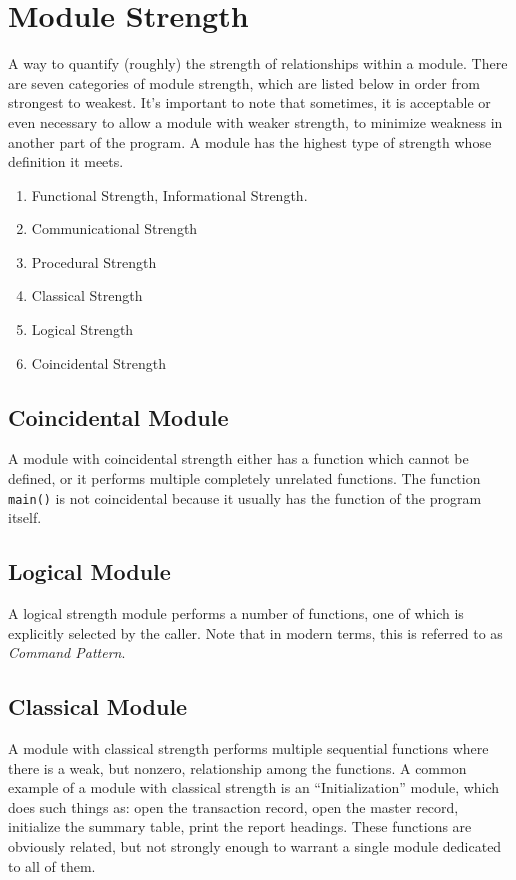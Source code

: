\documentclass{designdoc}
\begin{document}
\section{Module Strength}
A way to quantify (roughly) the strength of relationships within a module.
There are seven categories of module strength, which are listed below in order
from strongest to weakest. It's important to note that sometimes, it is
acceptable or even necessary to allow a module with weaker strength, to
minimize weakness in another part of the program. A module has the highest
type of strength whose definition it meets.
\begin{enumerate}
\item Functional Strength, Informational Strength.
\item Communicational Strength
\item Procedural Strength
\item Classical Strength
\item Logical Strength
\item Coincidental Strength
\end{enumerate}

\subsection{Coincidental Module}
A module with coincidental strength either has a function which cannot be
defined, or it performs multiple completely unrelated functions. The function
\texttt{main()} is not coincidental because it usually has the function of the
program itself.

\subsection{Logical Module}
A logical strength module performs a number of functions, one of which is
explicitly selected by the caller. Note that in modern terms, this is referred
to as {\it Command Pattern}.

\subsection{Classical Module}
A module with classical strength performs multiple sequential functions where
there is a weak, but nonzero, relationship among the functions. A common
example of a module with classical strength is an ``Initialization'' module,
which does such things as: open the transaction record, open the master record,
initialize the summary table, print the report headings. These functions are
obviously related, but not strongly enough to warrant a single module dedicated
to all of them.
\end{document}

